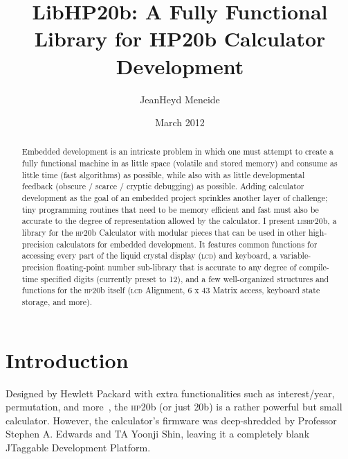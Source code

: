 \documentclass{LibHP20b}
\title{LibHP20b:
A Fully Functional Library for HP20b Calculator Development}
\author{JeanHeyd Meneide}
\date{March 2012}
\begin{document}
\newcommand{\HP}[1][libhp]{\textsc{#1}20b}
\newcommand{\LCD}{\textsc{lcd}}
\newcommand{\RPN}{\textsc{rpn}}
\newcommand{\Sev}{\textsc{s}7}
\newcommand{\Col}[2]{{\color{#1} #2}}
\newcommand{\CWord}[1]{\texttt{#1}}
\newcommand{\CKey}[1]{{\color{blue} \texttt{#1}}}
\newcommand{\CMem}[2]{{\color{blue} \texttt{#1}.}{\color{salmonpink} \texttt{#2}}}
\newcommand{\CPMem}[2]{{\color{blue} \texttt{#1}->}{\color{salmonpink} \texttt{#2}}}
\newcommand{\CFun}[1]{{\color{funccolor} \texttt{#1}}}
\newcommand{\HPButton}[1]{{\color{buttoncolor} \texttt{[ #1 ]}}}
\maketitle

\begin{abstract}

Embedded development is an intricate problem in which one must attempt to create a fully functional machine in as little space (volatile and stored memory) and consume as little time (fast algorithms) as possible, while also with as little developmental feedback (obscure / scarce / cryptic debugging) as possible.
Adding calculator development as the goal of an embedded project sprinkles another layer of challenge; tiny programming routines that need to be memory efficient and fast must also be accurate to the degree of representation allowed by the calculator.
I present \HP, a library for the \HP[hp] Calculator with modular pieces that can be used in other high-precision calculators for embedded development. It features common functions for accessing every part of the liquid crystal display (\LCD) and keyboard, a variable-precision floating-point number sub-library that is accurate to any degree of compile-time specified digits (currently preset to 12), and a few well-organized structures and functions for the \HP[hp] itself (\LCD{} Alignment, 6 x 43 Matrix access,  keyboard state storage, and more).

\end{abstract}

\section{Introduction}
Designed by Hewlett Packard with extra functionalities such as interest/year, permutation, and more~\cite{hp20bmanual}, the \HP[hp] (or just \HP[]) is a rather powerful but small calculator. However, the calculator's firmware was deep-shredded by Professor Stephen A. Edwards and TA Yoonji Shin, leaving it a completely blank JTaggable Development Platform.
\end{document}
